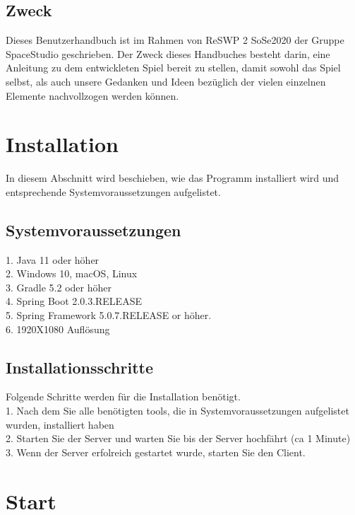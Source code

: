 \documentclass[fontsize=12pt,paper=a4,twoside]{scrartcl}
\begin{document}
\subsection{Zweck}

Dieses Benutzerhandbuch ist im Rahmen von ReSWP 2 SoSe2020  der Gruppe SpaceStudio geschrieben.
Der Zweck dieses Handbuches besteht darin, eine Anleitung zu dem entwickleten Spiel bereit zu stellen, damit sowohl das Spiel selbst, als auch unsere Gedanken und Ideen bezüglich der vielen einzelnen Elemente nachvollzogen werden können.


\section{Installation}
In diesem Abschnitt wird beschieben, wie das Programm installiert wird und entsprechende Systemvoraussetzungen aufgelistet.

\subsection{Systemvoraussetzungen}
1. Java 11 oder höher \\
2. Windows 10, macOS, Linux \\
3. Gradle 5.2 oder höher \\
4. Spring Boot 2.0.3.RELEASE \\
5.  Spring Framework 5.0.7.RELEASE or höher. \\
6. 1920X1080 Auflösung
 

\subsection{Installationsschritte}
Folgende  Schritte werden für die Installation benötigt. \\
1. Nach dem Sie alle benötigten tools, die in Systemvoraussetzungen aufgelistet wurden, installiert haben \\
2. Starten Sie der Server und warten Sie bis der Server hochfährt (ca 1 Minute)\\
3. Wenn der Server erfolreich gestartet wurde, starten Sie den Client.




\section{Start}
\end{document}
